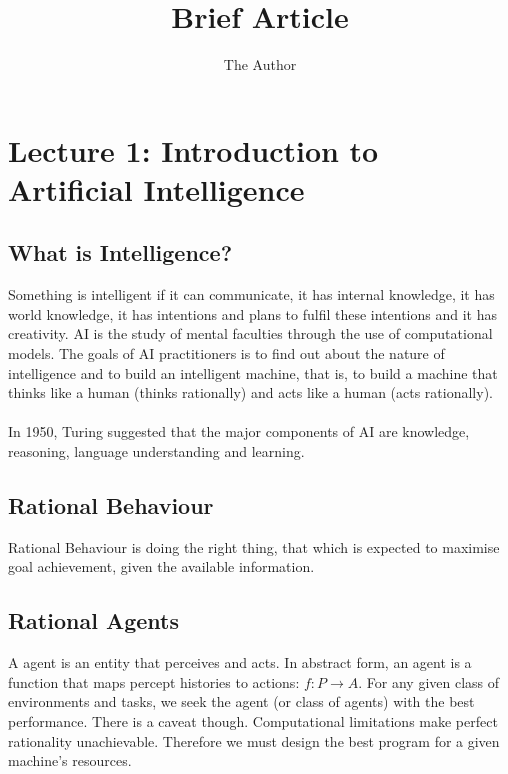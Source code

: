 \documentclass[11pt, oneside]{article}   	%
\title{Brief Article}
\author{The Author}
\begin{document}
\maketitle
\tableofcontents
\section{Lecture 1: Introduction to Artificial Intelligence}

\subsection{What is Intelligence?}

Something is intelligent if it can communicate, it has internal knowledge, it has world knowledge, it has intentions and plans to fulfil these intentions and it has creativity. AI is the study of mental faculties through the use of computational models. The goals of AI practitioners is to find out about the nature of intelligence and to build an intelligent machine, that is, to build a machine that thinks like a human (thinks rationally) and acts like a human (acts rationally).
\\\\
In 1950, Turing suggested that the major components of AI are knowledge, reasoning, language understanding and learning. 

\subsection{Rational Behaviour}
Rational Behaviour is doing the right thing, that which is expected to maximise goal achievement, given the available information.

\subsection{Rational Agents}
A agent is an entity that perceives and acts. In abstract form, an agent is a function that maps percept histories to actions: $f: P \rightarrow A$. For any given class of environments and tasks, we seek the agent (or class of agents) with the best performance. There is a caveat though. Computational limitations make perfect rationality unachievable. Therefore we must design the best program for a given machine's resources.
\end{document}
